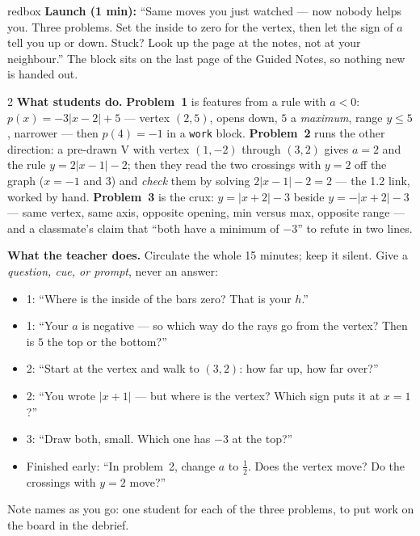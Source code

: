 \documentclass[10pt]{article}
\begin{document}
\begin{skillbox}{redbox}
\textbf{Launch (1 min):} ``Same moves you just watched --- now nobody helps you. Three problems.
Set the inside to zero for the vertex, then let the sign of $a$ tell you up or down. Stuck? Look
up the page at the notes, not at your neighbour.'' The block sits on the last page of the Guided
Notes, so nothing new is handed out.
\begin{multicols}{2}
\textbf{What students do.} \textbf{Problem~1} is features from a rule with $a<0$:
$p(x)=-3|x-2|+5$ --- vertex $(2,5)$, opens down, $5$ a \emph{maximum}, range $y\le5$, narrower ---
then $p(4)=-1$ in a \texttt{work} block. \textbf{Problem~2} runs the other direction: a pre-drawn
V with vertex $(1,-2)$ through $(3,2)$ gives $a=2$ and the rule $y=2|x-1|-2$; then they read the two
crossings with $y=2$ off the graph ($x=-1$ and $3$) and \emph{check} them by solving
$2|x-1|-2=2$ --- the 1.2 link, worked by hand. \textbf{Problem~3} is the crux: $y=|x+2|-3$ beside
$y=-|x+2|-3$ --- same vertex, same axis, opposite opening, min versus max, opposite range --- and a
classmate's claim that ``both have a minimum of $-3$'' to refute in two lines.

\columnbreak
\textbf{What the teacher does.} Circulate the whole 15 minutes; keep it silent. Give a
\emph{question, cue, or prompt}, never an answer:
\begin{itemize}[leftmargin=1.1em, nosep]
  \item 1: ``Where is the inside of the bars zero? That is your $h$.''
  \item 1: ``Your $a$ is negative --- so which way do the rays go from the vertex? Then is $5$ the
        top or the bottom?''
  \item 2: ``Start at the vertex and walk to $(3,2)$: how far up, how far over?''
  \item 2: ``You wrote $|x+1|$ --- but where is the vertex? Which sign puts it at $x=1$?''
  \item 3: ``Draw both, small. Which one has $-3$ at the top?''
  \item Finished early: ``In problem~2, change $a$ to $\tfrac12$. Does the vertex move? Do the
        crossings with $y=2$ move?''
\end{itemize}
Note names as you go: one student for each of the three problems, to put work on the board in the
debrief.
\end{multicols}
\end{skillbox}
\end{document}

